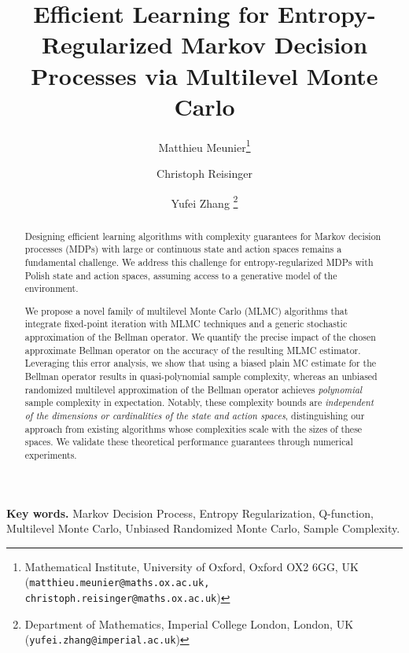 \documentclass[11pt]{article}
\numberwithin{equation}{section}
\theoremstyle{definition}
\theoremstyle{remark}
\begin{document}
\title{Efficient Learning for Entropy-Regularized Markov Decision Processes via Multilevel Monte Carlo} 
 
  



\author{
Matthieu Meunier\thanks{Mathematical Institute, University of Oxford, Oxford OX2 6GG, UK ({\tt matthieu.meunier@maths.ox.ac.uk,
 christoph.reisinger@maths.ox.ac.uk})} 
\and
Christoph Reisinger\footnotemark[1]
\and
Yufei Zhang \thanks{Department of Mathematics, Imperial College London,  London,  UK  ({\tt yufei.zhang@imperial.ac.uk})}
}


\date{}
%
%
\maketitle




\begin{abstract}%

Designing efficient learning algorithms with complexity guarantees for Markov decision processes (MDPs) with large or continuous state and action spaces remains a fundamental challenge. 
We address this challenge for  entropy-regularized MDPs with Polish state and action spaces, assuming access to a generative model of the environment.

We propose a novel family of multilevel Monte Carlo (MLMC) algorithms that integrate fixed-point iteration with MLMC techniques and a generic stochastic approximation of the Bellman operator. We   quantify the precise  impact of the chosen approximate Bellman operator on the accuracy of the resulting MLMC estimator.
Leveraging this error analysis, we show that using a biased plain MC estimate for the Bellman operator results in quasi-polynomial sample complexity, whereas an unbiased randomized multilevel approximation 
of the Bellman operator
achieves \emph{polynomial} sample complexity in expectation. Notably, these  complexity bounds are \emph{independent of the   dimensions or cardinalities of the state and action spaces}, distinguishing our approach from existing algorithms whose complexities scale with the sizes of these spaces. We validate these theoretical performance guarantees    through numerical experiments.

\end{abstract}

\medskip
\noindent
\textbf{Key words.} 
Markov Decision Process, 
Entropy Regularization,
Q-function, Multilevel Monte Carlo, Unbiased Randomized Monte Carlo, Sample Complexity.
 
\end{document}
